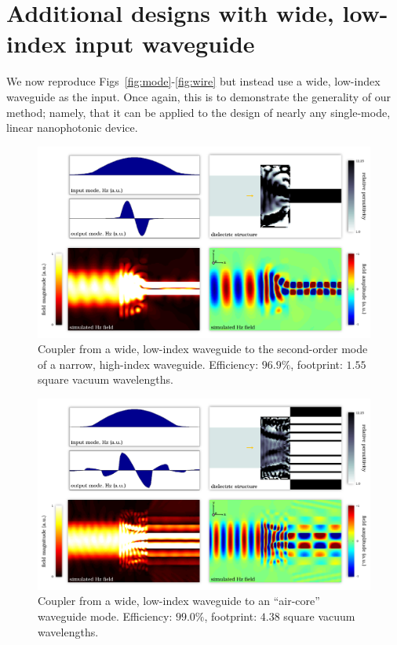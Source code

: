 \section{Additional designs with wide, low-index input waveguide}
We now reproduce Figs~\ref{fig:mode}-\ref{fig:wire}
    but instead use a wide, low-index waveguide as the input.
Once again, this is to demonstrate the generality of our method;
    namely, that it can be applied to the design of nearly any
    single-mode, linear nanophotonic device.
\begin{figure}[h!]
    \centering
    \includegraphics[width=\textwidth]{p3/12}
    \caption{
        Coupler from a wide, low-index waveguide to the
            second-order mode of a narrow, high-index waveguide.
        Efficiency: $96.9\%$,
        footprint: $1.55$ square vacuum wavelengths.
        }
\end{figure}
\begin{figure}[h!]
    \centering
    \includegraphics[width=\textwidth]{p3/13}
    \caption{
        Coupler from a wide, low-index waveguide to an 
            ``air-core'' waveguide mode.
        Efficiency: $99.0\%$,
        footprint: $4.38$ square vacuum wavelengths.
        }
\end{figure}

